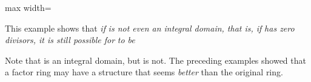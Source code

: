 \documentclass[11pt,oneside]{article}
\begin{document}
\begin{BookBody}
\begin{center}\begin{adjustbox}{max width=\linewidth}\end{adjustbox}\end{center}

\noindent This example shows that\textit{ if}  \textit{is not even an integral domain, that is, if}  \textit{has zero} \textit{divisors, it is still possible for}  \textit{to be} \BookEnd{\blacktriangle}

 Note that  is an integral domain, but  is not. The preceding examples showed that a factor ring may have a structure that seems\textit{ better} than the original ring.

\end{BookBody}

\BookNarrativetrue
\end{document}
